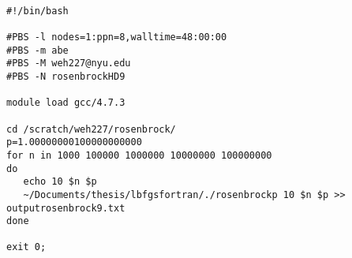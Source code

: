 \begin{lstlisting}

#!/bin/bash

#PBS -l nodes=1:ppn=8,walltime=48:00:00
#PBS -m abe
#PBS -M weh227@nyu.edu
#PBS -N rosenbrockHD9

module load gcc/4.7.3

cd /scratch/weh227/rosenbrock/
p=1.00000000100000000000
for n in 1000 100000 1000000 10000000 100000000
do
   echo 10 $n $p
   ~/Documents/thesis/lbfgsfortran/./rosenbrockp 10 $n $p >> outputrosenbrock9.txt
done

exit 0;



\end{lstlisting}
